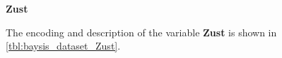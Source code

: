 \Large
\centerline{\textbf{Zust}}
\normalsize
The encoding and description of the variable \textbf{Zust} is shown in \autoref{tbl:baysis_dataset_Zust}.

